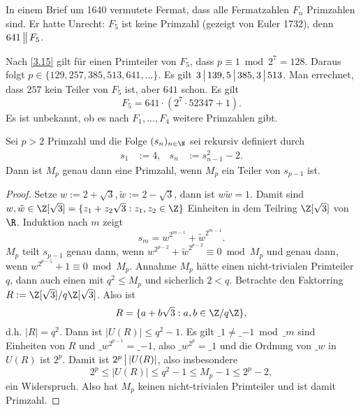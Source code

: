 \begin{nt} \label{3.16}
	In einem Brief um 1640 vermutete Fermat, dass alle Fermatzahlen $F_n$ Primzahlen sind.
	Er hatte Unrecht: $F_5$ ist keine Primzahl (gezeigt von Euler 1732), denn $641 \divs* F_5$.

	Nach \ref{3.15} gilt für einen Primteiler von $F_5$, dass $p \equiv 1 \bmod 2^7 = 128$.
	Daraus folgt $p \in \{129, 257, 385, 513, 641, \dotsc\}$.
	Es gilt $3 \divs 139, 5 \divs 385, 3 \divs 513$.
	Man errechnet, dass $257$ kein Teiler von $F_5$ ist, aber $641$ schon.
	Es gilt
	\[
		F_5 = 641 \cdot (2^7 \cdot 52347 + 1).
	\]
	Es ist unbekannt, ob es nach $F_1, \dotsc, F_4$ weitere Primzahlen gibt.
\end{nt}

\begin{st} \label{3.17}
	Sei $p > 2$ Primzahl und die Folge $(s_n)_{n\in\N}$ sei rekursiv definiert durch
	\begin{align*}
		s_1 &:= 4, &
		s_{n} &:= s_{n-1}^2 - 2.
	\end{align*}
	Dann ist $M_p$ genau dann eine Primzahl, wenn $M_p$ ein Teiler von $s_{p-1}$ ist.
	\begin{proof}
		Setze $w := 2 + \sqrt 3, \tilde w := 2 - \sqrt 3$, dann ist $w\tilde w = 1$.
		Damit sind $w, \tilde w \in \Z[\sqrt{3}] = \{ z_1 + z_2 \sqrt{3} : z_1, z_2 \in \Z \}$ Einheiten in dem Teilring $\Z[\sqrt{3}]$ von $\R$.
		Induktion nach $m$ zeigt \Exercise
		\[
			s_m = w^{2^{m-1}} + \tilde w^{2^{m-1}}.
		\]
		$M_p$ teilt $s_{p-1}$ genau dann, wenn $w^{2^{p-2}} + \tilde w^{2^{p-2}} \equiv 0 \bmod M_p$ und genau dann, wenn $w^{2^{p-1}} + 1 \equiv 0 \bmod M_p$.
		Annahme $M_p$ hätte einen nicht-trivialen Primteiler $q$, dann auch einen mit $q^2 \le M_p$ und sicherlich $2 < q$.
		Betrachte den Faktorring $R := \Z[\sqrt{3}] / q\Z[\sqrt{3}]$.
		Also ist
		\[
			R = \{ a + b\sqrt{3} : a,b \in \Z / q\Z \},
		\]
		d.h. $|R| = q^2$.
		Dann ist $|U(R)| \le q^2 - 1$.
		Es gilt $\_{1} \neq \_{-1} \bmod \_m$ sind Einheiten von $R$ und $\_w^{2^{p-1}} = \_{-1}$, also $\_w^{2^p} = \_ 1$ und die Ordnung von $\_w$ in $U(R)$ ist $2^p$.
		Damit ist $2^p \divs |U(R)|$, also insbesondere
		\[
			2^p \le |U(R)| \le q^2 - 1 \le M_p - 1 \le 2^{p}-2,
		\]
		ein Widerspruch.
		Also hat $M_p$ keinen nicht-trivialen Primteiler und ist damit Primzahl.


\end{proof}
\end{st}
